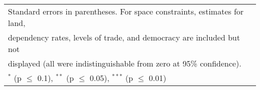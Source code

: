 \begin{table}[htbp]
\begin{tabular}{l*{5}{c}}
\hline\hline
\multicolumn{6}{l}{\footnotesize Standard errors in parentheses. For space constraints, estimates for land,} \\
\multicolumn{6}{l}{\footnotesize dependency rates, levels of trade, and democracy are included but not} \\
\multicolumn{6}{l}{\footnotesize displayed (all were indistinguishable from zero at 95\% confidence).}\\
\multicolumn{6}{l}{\footnotesize $^{*}$ (p $\le$ 0.1), $^{**}$ (p $\le$ 0.05), $^{***}$ (p $\le$ 0.01)}\\
\end{tabular}
\end{table}
